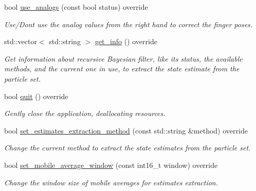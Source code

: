 \begin{DoxyCompactItemize}
bool \hyperlink{classVisualSIS_a703f84794cd66eb82040d2590b62f094}{use\+\_\+analogs} (const bool status) override
\begin{DoxyCompactList}\small\item\em Use/\+Don\textquotesingle{}t use the analog values from the right hand to correct the finger poses. \end{DoxyCompactList}\item 
std\+::vector$<$ std\+::string $>$ \hyperlink{classVisualSIS_af1ecb78ecc8c9838c05b7d29c5a9f83a}{get\+\_\+info} () override
\begin{DoxyCompactList}\small\item\em Get information about recursive Bayesian filter, like it\textquotesingle{}s status, the available methods, and the current one in use, to extract the state estimate from the particle set. \end{DoxyCompactList}\item 
bool \hyperlink{classVisualSIS_abff835a326f38e95187148d9401d5170}{quit} () override
\begin{DoxyCompactList}\small\item\em Gently close the application, deallocating resources. \end{DoxyCompactList}\item 
bool \hyperlink{classVisualSIS_ab45998859ed6c115eb0a8446f94c764e}{set\+\_\+estimates\+\_\+extraction\+\_\+method} (const std\+::string \&method) override
\begin{DoxyCompactList}\small\item\em Change the current method to extract the state estimates from the particle set. \end{DoxyCompactList}\item 
bool \hyperlink{classVisualSIS_a08aa7928cccabd93a1907cb540863cda}{set\+\_\+mobile\+\_\+average\+\_\+window} (const int16\+\_\+t window) override
\begin{DoxyCompactList}\small\item\em Change the window size of mobile averages for estimates extraction. \end{DoxyCompactList}\end{DoxyCompactItemize}
